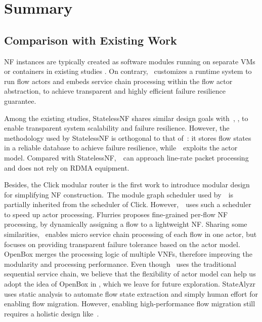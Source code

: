 \section{Summary}
\label{sec:nfvactor-conclusion}

\subsection{Comparison with Existing Work}
\label{sec:nfvactor-related-work}

NF instances are typically created as software modules running on separate VMs or containers in existing studies \cite{gember2012stratos, palkar2015e2, rajagopalan2013split, khalid2016paving, gember2015opennf, zhang2016flurries}. On contrary, \nfactor~customizes a runtime system to run flow actors and embeds service chain processing within the flow actor abstraction, to achieve transparent and highly efficient failure resilience guarantee.


Among the existing studies, StatelessNF \cite{201545} shares similar design goals with~\nfactor, \ie, to enable transparent system scalability and failure resilience. However, the methodology used by StatelessNF is orthogonal to that of~\nfactor: it stores flow states in a reliable database \cite{ongaro2011fast} to achieve failure resilience, while~\nfactor~exploits the actor model. Compared with StatelessNF,~\nfactor~can approach line-rate packet processing and does not rely on RDMA equipment.

Besides, the Click modular router \cite{kohler2000click} is the first work to introduce modular design for simplifying NF construction.~The module graph scheduler used by~\nfactor~is partially inherited from the scheduler of Click. However,~\nfactor~uses such a scheduler to speed up actor processing. Flurries \cite{zhang2016flurries} proposes fine-grained per-flow NF processing, by dynamically assigning a flow to a lightweight NF. Sharing some similarities, \nfactor~enables micro service chain processing of each flow in one actor, but focuses on providing transparent failure tolerance based on the actor model. OpenBox \cite{OpenBox} merges the processing logic of multiple VNFs, therefore improving the modularity and processing performance. Even though \nfactor~uses the traditional sequential service chain, we believe that the flexibility of actor model can help us adopt the idea of OpenBox in \nfactor, which we leave for future exploration. StateAlyzr \cite{khalid2016paving} uses static analysis to automate flow state extraction and simply human effort for enabling flow migration. However, enabling high-performance flow migration still requires a holistic design like~\nfactor.

